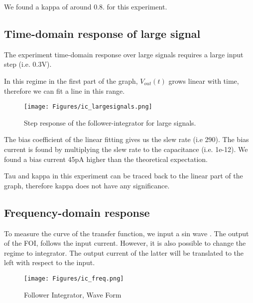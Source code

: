 We found a kappa of around 0.8. for this experiment. 

\subsection{Time-domain response of large signal}

The experiment time-domain response over large signals requires a large input step (i.e. 0.3V).

In this regime in the first part of the graph, $V_{out}(t)$ grows linear with time, therefore we can fit a line in this range. 


\begin{figure}[H]
    \centering
    \texttt{[image: Figures/ic\_largesignals.png]}
    \caption{Step response of the follower-integrator for large signals.}
    \label{fig:basalandcerebellum}
\end{figure}



The bias coefficient of the linear fitting gives us the slew rate (i.e 290). The bias current is found by multiplying the slew rate to the capacitance (i.e. 1e-12). We found a bias current 45pA higher than the theoretical expectation.

Tau and kappa in this experiment can be traced back to the linear part of the graph, therefore kappa does not have any significance. 

\subsection{Frequency-domain response}

To measure the curve of the transfer function, we input a sin wave . The output of the FOI, follows the input current. However, it is also possible to change the regime to integrator. The output current of the latter will be translated to the left with respect to the input. 

\begin{figure}[H]
    \centering
    \texttt{[image: Figures/ic\_freq.png]}
    \caption{Follower Integrator, Wave Form}
    \label{fig:basalandcerebellum}
\end{figure}
